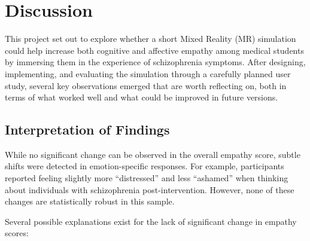 \chapter{Discussion}
\label{ch:discussion}

This project set out to explore whether a short Mixed Reality (MR) simulation could help increase both cognitive and affective empathy among medical students by immersing them in the experience of schizophrenia symptoms. After designing, implementing, and evaluating the simulation through a carefully planned user study, several key observations emerged that are worth reflecting on, both in terms of what worked well and what could be improved in future versions.

\section{Interpretation of Findings}

While no significant change can be observed in the overall empathy score, subtle shifts were detected in emotion-specific responses. For example, participants reported feeling slightly more “distressed” and less “ashamed” when thinking about individuals with schizophrenia post-intervention. However, none of these changes are statistically robust in this sample.

\vspace{1em}

Several possible explanations exist for the lack of significant change in empathy scores:

